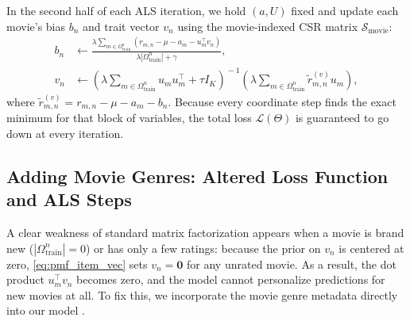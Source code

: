 \documentclass{article}
\theoremstyle{plain}
\theoremstyle{definition}
\begin{document}
In the second half of each ALS iteration, we hold $(a, U)$ fixed and update each movie's bias $b_n$ and trait vector $v_n$ using the movie-indexed CSR matrix $\mathcal{S}_{\text{movie}}$:
\begin{align}
    b_n &\leftarrow \frac{\lambda \sum_{m \in \Omega_{\text{train}}^n} \left(r_{m,n} - \mu - a_m - u_m^\top v_n\right)}{\lambda |\Omega_{\text{train}}^n| + \gamma}, \label{eq:pmf_item_bias} \\
    v_n &\leftarrow \!\left(\lambda \!\! \sum_{m \in \Omega_{\text{train}}^n} \!\! u_m u_m^\top + \tau I_K\right)^{\!-1} \!\!\!\! \left(\lambda \!\! \sum_{m \in \Omega_{\text{train}}^n} \!\! \tilde{r}_{m,n}^{(v)} u_m\right)\!, \label{eq:pmf_item_vec}
\end{align}
where $\tilde{r}_{m,n}^{(v)} = r_{m,n} - \mu - a_m - b_n$. Because every coordinate step finds the exact minimum for that block of variables, the total loss $\mathcal{L}(\Theta)$ is guaranteed to go down at every iteration.

\subsection{Adding Movie Genres: Altered Loss Function and ALS Steps}
\label{sec:genre_model}

A clear weakness of standard matrix factorization appears when a movie is brand new ($|\Omega_{\text{train}}^n| = 0$) or has only a few ratings: because the prior on $v_n$ is centered at zero, \cref{eq:pmf_item_vec} sets $v_n = \mathbf{0}$ for any unrated movie. As a result, the dot product $u_m^\top v_n$ becomes zero, and the model cannot personalize predictions for new movies at all. To fix this, we incorporate the movie genre metadata directly into our model \cite{agarwal2009regression}.
\end{document}
